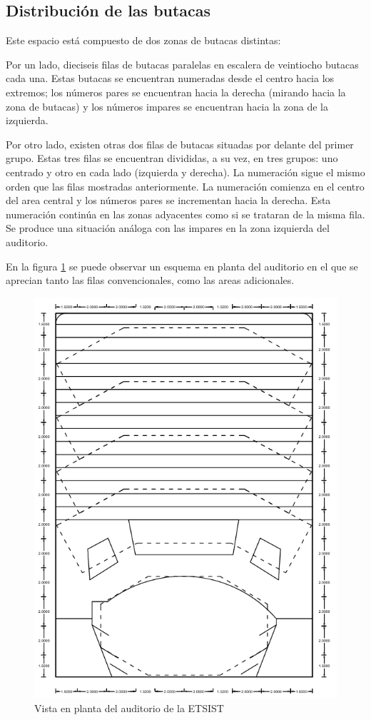 \documentclass[11pt,a4paper,twoside]{book}
\begin{document}
		\subsection{Distribución de las butacas}
			Este espacio está compuesto de dos zonas de butacas distintas:

 			Por un lado, dieciseis filas de butacas paralelas en escalera de veintiocho butacas cada una. Estas butacas se encuentran numeradas desde el centro hacia los extremos; los números pares se encuentran hacia la derecha (mirando hacia la zona de butacas) y los números impares se encuentran hacia la zona de la izquierda.
 
 			Por otro lado, existen otras dos filas de butacas situadas por delante del primer grupo. Estas tres filas se encuentran divididas, a su vez, en tres grupos: uno centrado y otro en cada lado (izquierda y derecha). La numeración sigue el mismo orden que las filas mostradas anteriormente. La numeración comienza en el centro del area central y los números pares se incrementan hacia la derecha. Esta numeración continúa en las zonas adyacentes como si se trataran de la misma fila. Se produce una situación análoga con las impares en la zona izquierda del auditorio.
 
 			En la figura \ref{fig:auditorio} se puede observar un esquema en planta del auditorio en el que se aprecian tanto las filas convencionales, como las areas adicionales.
			\begin{figure}
				\includegraphics[scale=0.6]{../imagenes/auditorio.png}
				\centering
				\caption{Vista en planta del auditorio de la ETSIST}
				\label{fig:auditorio}
			\end{figure}
			
\end{document}
